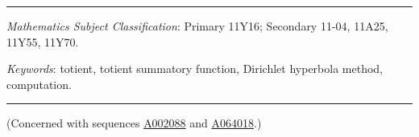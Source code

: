 \documentclass[12pt]{article}
\newcommand{\seqnum}[1]{\href{https://oeis.org/#1}{#1}}
\begin{document}

\setlength{\bibitemsep}{\parskip}
\printbibliography[heading=bibnumbered]

\bigskip
\hrule
\bigskip

 \emph{Mathematics Subject Classification}: Primary 11Y16; Secondary 11-04, 11A25, 11Y55, 11Y70.

\noindent \emph{Keywords}: totient, totient summatory function, Dirichlet hyperbola method, computation.


\bigskip
\hrule
\bigskip

\noindent (Concerned with sequences \seqnum{A002088} and \seqnum{A064018}.)
\end{document}
